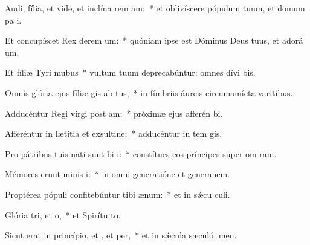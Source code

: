\item Audi, fília, et vide, et inclína rem am:~* et oblivíscere pópulum tuum, et domum pa i.
\item Et concupíscet Rex derem um:~* quóniam ipse est Dóminus Deus tuus, et adorá um.
\item Et fíliæ Tyri  mubus~* vultum tuum deprecabúntur: omnes dívi bis.
\item Omnis glória ejus fíliæ gis ab tus,~* in fímbriis áureis circumamícta varitibus.
\item Adducéntur Regi vírgi post am:~* próximæ ejus afferén bi.
\item Afferéntur in lætítia et exsultine:~* adducéntur in tem gis.
\item Pro pátribus tuis nati sunt bi i:~* constítues eos príncipes super om ram.
\item Mémores erunt minis i:~* in omni generatióne et generanem.
\item Proptérea pópuli confitebúntur tibi  ænum:~* et in sǽcu culi.
\item Glória tri, et o,~* et Spirítu to.
\item Sicut erat in princípio, et , et per,~* et in sǽcula sæculó. men.
